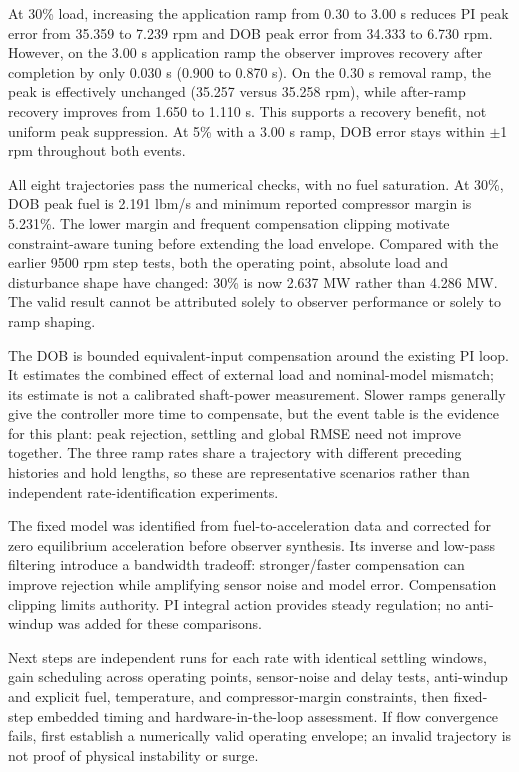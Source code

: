 At 30\% load, increasing the application ramp from 0.30 to 3.00 s reduces PI peak error from 35.359 to 7.239 rpm and DOB peak error from 34.333 to 6.730 rpm. However, on the 3.00 s application ramp the observer improves recovery after completion by only 0.030 s (0.900 to 0.870 s). On the 0.30 s removal ramp, the peak is effectively unchanged (35.257 versus 35.258 rpm), while after-ramp recovery improves from 1.650 to 1.110 s. This supports a recovery benefit, not uniform peak suppression. At 5\% with a 3.00 s ramp, DOB error stays within $\pm$1 rpm throughout both events.

All eight trajectories pass the numerical checks, with no fuel saturation. At 30\%, DOB peak fuel is 2.191 lbm/s and minimum reported compressor margin is 5.231\%. The lower margin and frequent compensation clipping motivate constraint-aware tuning before extending the load envelope. Compared with the earlier 9500 rpm step tests, both the operating point, absolute load and disturbance shape have changed: 30\% is now 2.637 MW rather than 4.286 MW. The valid result cannot be attributed solely to observer performance or solely to ramp shaping.

The DOB is bounded equivalent-input compensation around the existing PI loop. It estimates the combined effect of external load and nominal-model mismatch; its estimate is not a calibrated shaft-power measurement. Slower ramps generally give the controller more time to compensate, but the event table is the evidence for this plant: peak rejection, settling and global RMSE need not improve together. The three ramp rates share a trajectory with different preceding histories and hold lengths, so these are representative scenarios rather than independent rate-identification experiments.

The fixed model was identified from fuel-to-acceleration data and corrected for zero equilibrium acceleration before observer synthesis. Its inverse and low-pass filtering introduce a bandwidth tradeoff: stronger/faster compensation can improve rejection while amplifying sensor noise and model error. Compensation clipping limits authority. PI integral action provides steady regulation; no anti-windup was added for these comparisons.

Next steps are independent runs for each rate with identical settling windows, gain scheduling across operating points, sensor-noise and delay tests, anti-windup and explicit fuel, temperature, and compressor-margin constraints, then fixed-step embedded timing and hardware-in-the-loop assessment. If flow convergence fails, first establish a numerically valid operating envelope; an invalid trajectory is not proof of physical instability or surge.

